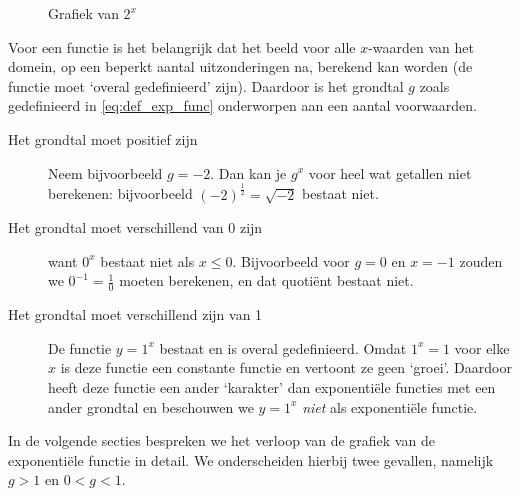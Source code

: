  \begin{figure}[htbp]
      \centering
     \caption{Grafiek van $2^{x}$}
     \label{fig:2x}
 \end{figure}

Voor een functie is het belangrijk dat het beeld voor alle $x$-waarden van het domein, op een beperkt aantal uitzonderingen na, berekend kan worden (de functie moet `overal gedefinieerd' zijn). Daardoor is het grondtal $g$ zoals gedefinieerd in \eqref{eq:def_exp_func} onderworpen aan een aantal voorwaarden.
\begin{description}
\item[ Het grondtal moet positief zijn]  
Neem bijvoorbeeld $g=-2$. Dan kan je $g^x$ voor heel wat getallen niet berekenen: bijvoorbeeld $(-2)^\frac12=\sqrt{-2}$ bestaat niet.
\item[Het grondtal moet verschillend van $0$ zijn] want $0^{x}$ bestaat
    niet als $x\leq 0$. Bijvoorbeeld  voor $g=0$ en $x=-1$ zouden we $0^{-1}=\frac{1}{0}$ moeten berekenen, en dat quoti\"ent bestaat niet.
\item[Het grondtal moet verschillend zijn van 1] De functie $y=1^x$ bestaat en is overal gedefinieerd. Omdat $1^x=1$ voor elke $x$ is deze functie een constante functie en vertoont ze geen `groei'. Daardoor heeft deze functie een ander `karakter' dan exponenti\"ele functies met een ander grondtal en beschouwen we $y=1^x$ \emph{niet} als exponenti\"ele functie.
\end{description}

In de volgende secties bespreken we het verloop van de grafiek van de exponenti\"ele functie in detail. We onderscheiden hierbij twee gevallen, namelijk $g>1$ en $0<g<1$.

